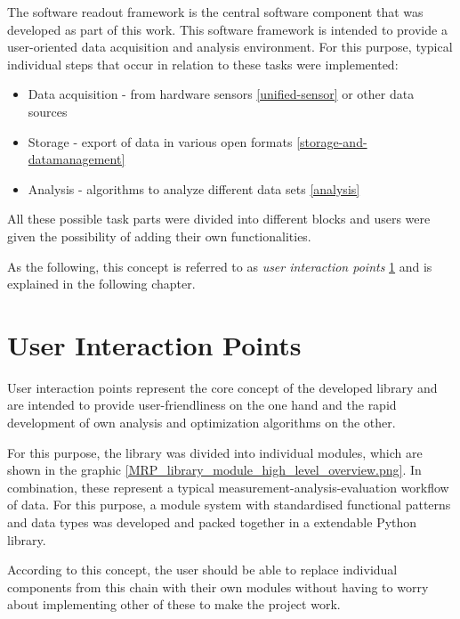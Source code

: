 The software readout framework is the central software component that
was developed as part of this work. This software framework is intended
to provide a user-oriented data acquisition and analysis environment.
For this purpose, typical individual steps that occur in relation to
these tasks were implemented:

\begin{itemize}
\tightlist
\item
  Data acquisition - from hardware sensors \ref{unified-sensor} or other
  data sources
\item
  Storage - export of data in various open formats
  \ref{storage-and-datamanagement}
\item
  Analysis - algorithms to analyze different data sets \ref{analysis}
\end{itemize}

All these possible task parts were divided into different blocks and
users were given the possibility of adding their own functionalities.

As the following, this concept is referred to as \emph{user interaction
points} \ref{user-interaction-points} and is explained in the following
chapter.

\hypertarget{user-interaction-points}{%
\section{User Interaction Points}\label{user-interaction-points}}

User interaction points represent the core concept of the developed
library and are intended to provide user-friendliness on the one hand
and the rapid development of own analysis and optimization algorithms on
the other.

For this purpose, the library was divided into individual modules, which
are shown in the graphic
\ref{MRP_library_module_high_level_overview.png}. In combination, these
represent a typical measurement-analysis-evaluation workflow of data.
For this purpose, a module system with standardised functional patterns
and data types was developed and packed together in a extendable Python
library.

\newpage

According to this concept, the user should be able to replace individual
components from this chain with their own modules without having to
worry about implementing other of these to make the project work.


